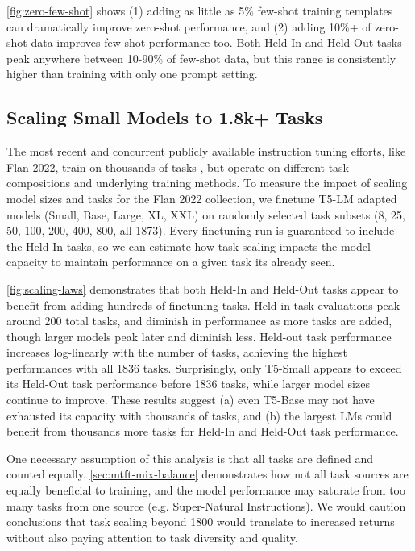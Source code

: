 \ref{fig:zero-few-shot} shows (1) adding as little as 5\% few-shot training templates can dramatically improve zero-shot performance, and (2) adding 10\%+ of zero-shot data improves few-shot performance too. Both Held-In and Held-Out tasks peak anywhere between 10-90\% of few-shot data, but this range is consistently higher than training with only one prompt setting.

\subsection{Scaling Small Models to 1.8k+ Tasks}
\label{sec:mtft-scaling}

The most recent and concurrent publicly available instruction tuning efforts, like Flan 2022, train on thousands of tasks \citep{wang2022benchmarking,iyer2022optiml}, but operate on different task compositions and underlying training methods. To measure the impact of scaling model sizes and tasks for the  Flan 2022 collection, we finetune T5-LM adapted models (Small, Base, Large, XL, XXL) on randomly selected task subsets (8, 25, 50, 100, 200, 400, 800, all 1873). Every finetuning run is guaranteed to include the Held-In tasks, so we can estimate how task scaling impacts the model capacity to maintain performance on a given task its already seen.

\ref{fig:scaling-laws} demonstrates that both Held-In and Held-Out tasks appear to benefit from adding hundreds of finetuning tasks. Held-in task evaluations peak around 200 total tasks, and diminish in performance as more tasks are added, though larger models peak later and diminish less. Held-out task performance increases log-linearly with the number of tasks, achieving the highest performances with all 1836 tasks. Surprisingly, only T5-Small appears to exceed its Held-Out task performance before 1836 tasks, while larger model sizes continue to improve. These results suggest (a) even T5-Base may not have exhausted its capacity with thousands of tasks, and (b) the largest LMs could benefit from thousands more tasks for Held-In and Held-Out task performance.

One necessary assumption of this analysis is that all tasks are defined and counted equally.
\ref{sec:mtft-mix-balance} demonstrates how not all task sources are equally beneficial to training, and the model performance may saturate from too many tasks from one source (e.g. Super-Natural Instructions). We would caution conclusions that task scaling beyond 1800 would translate to increased returns without also paying attention to task diversity and quality.

